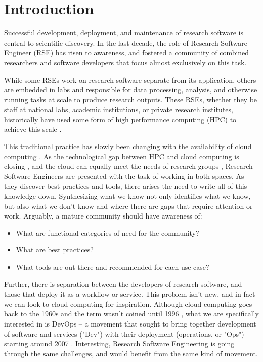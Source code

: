 \section{Introduction}

Successful development, deployment, and maintenance of research software is central to scientific discovery. In the last decade, the role of Research Software Engineer (RSE) \cite{rse-history} has risen to awareness, and fostered a community of combined researchers and software developers that focus almost exclusively on this task. 

While some RSEs work on research software separate from its application, others are embedded in labs and responsible for data processing, analysis, and otherwise running tasks at scale to produce research outputs. These RSEs, whether they be staff at national labs, academic institutions, or private research institutes, historically have used some form of high performance computing (HPC) to achieve this scale \cite{Wikipedia_contributors2021-kg, xsede-history-of-hpc}. 

This traditional practice has slowly been changing with the availability of cloud computing \cite{Scality2020-of}. As the technological gap between HPC and cloud computing is closing \cite{Guidi2020-ht}, and the cloud can equally meet the needs of research groups \cite{noauthor_2020-mn}, Research Software Engineers are presented with the task of working in both spaces. As they discover best practices and tools, there arises the need to write all of this knowledge down. Synthesizing what we know not only identifies what we know, but also what we don't know and where there are gaps that require attention or work. Arguably, a mature community should have awareness of:

\begin{itemize}
\item What are functional categories of need for the community?
\item What are best practices?
\item What tools are out there and recommended for each use case?
\end{itemize}

Further, there is separation between the developers of research software, and those that deploy it as a workflow or service. This problem isn't new, and in fact we can look to cloud computing for inspiration. Although cloud computing goes back to the 1960s \cite{Foote2017-fi} and the term wasn't coined until 1996 \cite{Scality2020-of}, what we are specifically interested in is DevOps -- a movement that sought to bring together development of software and services ("Dev") with their deployment (operations, or "Ops") starting around 2007 \cite{Atlassian_undated-ka}. Interesting, Research Software Engineering is going through the same challenges, and would benefit from the same kind of movement.

